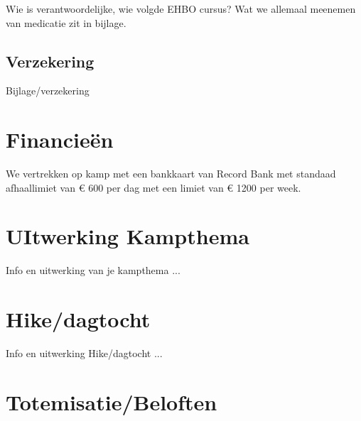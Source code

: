 \documentclass[fleqn,10pt]{src/KampSjabloon}
\begin{document}
Wie is verantwoordelijke, wie volgde EHBO cursus? Wat we allemaal meenemen van medicatie zit in bijlage. 

\subsection{Verzekering}

{Bijlage/verzekering} %
 

\section{Financieën}

We vertrekken op kamp met een bankkaart van Record Bank met standaad afhaallimiet van \euro{ 600} per dag met een limiet van \euro{ 1200} per week. 

\financieeloverzicht %


\section{UItwerking Kampthema}

Info en uitwerking van je kampthema ...


\section{Hike/dagtocht}

Info en uitwerking Hike/dagtocht ...


\section{Totemisatie/Beloften}
\end{document}
